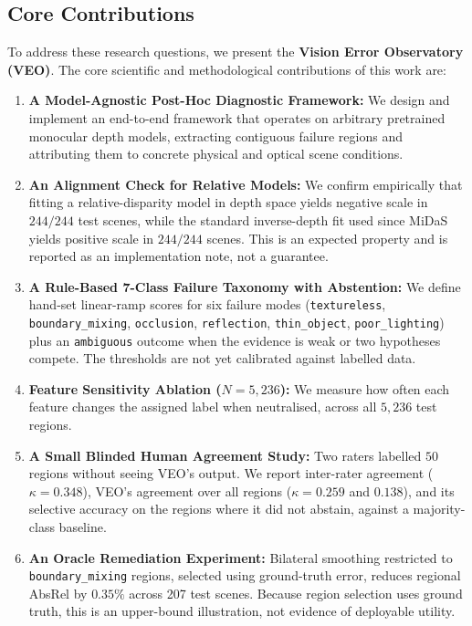 \documentclass[11pt,a4paper]{article}
\begin{document}
\subsection{Core Contributions}
To address these research questions, we present the \textbf{Vision Error Observatory (VEO)}. The core scientific and methodological contributions of this work are:
\begin{enumerate}
    \item \textbf{A Model-Agnostic Post-Hoc Diagnostic Framework:} We design and implement an end-to-end framework that operates on arbitrary pretrained monocular depth models, extracting contiguous failure regions and attributing them to concrete physical and optical scene conditions.
    \item \textbf{An Alignment Check for Relative Models:} We confirm empirically that fitting a relative-disparity model in depth space yields negative scale in $244/244$ test scenes, while the standard inverse-depth fit used since MiDaS \citep{ranftl2021vision} yields positive scale in $244/244$ scenes. This is an expected property and is reported as an implementation note, not a guarantee.
    \item \textbf{A Rule-Based 7-Class Failure Taxonomy with Abstention:} We define hand-set linear-ramp scores for six failure modes (\texttt{textureless}, \texttt{boundary\_mixing}, \texttt{occlusion}, \texttt{reflection}, \texttt{thin\_object}, \texttt{poor\_lighting}) plus an \texttt{ambiguous} outcome when the evidence is weak or two hypotheses compete. The thresholds are not yet calibrated against labelled data.
    \item \textbf{Feature Sensitivity Ablation ($N=5,236$):} We measure how often each feature changes the assigned label when neutralised, across all $5,236$ test regions.
    \item \textbf{A Small Blinded Human Agreement Study:} Two raters labelled $50$ regions without seeing VEO's output. We report inter-rater agreement ($\kappa = 0.348$), VEO's agreement over all regions ($\kappa = 0.259$ and $0.138$), and its selective accuracy on the regions where it did not abstain, against a majority-class baseline.
    \item \textbf{An Oracle Remediation Experiment:} Bilateral smoothing restricted to \texttt{boundary\_mixing} regions, selected using ground-truth error, reduces regional AbsRel by $0.35\%$ across 207 test scenes. Because region selection uses ground truth, this is an upper-bound illustration, not evidence of deployable utility.
\end{enumerate}
\end{document}
